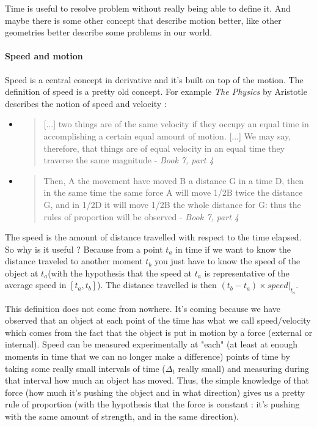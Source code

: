 \documentclass[12pt]{article}
\begin{document}
\bigskip

Time is useful to resolve problem without really being able to define it. And maybe there is some other concept that describe motion better, like other geometries better describe some problems in our world.

\paragraph{Speed and motion}

Speed is a central concept in derivative and it's built on top of the motion. The definition of speed is a pretty old concept. For example {\it The Physics} \cite{web_aristotle_the_physics} by Aristotle describes the notion of speed and velocity :
\begin{itemize}
    \item
\begin{quote}
[...] two things are of the same velocity if they occupy an equal time in accomplishing a certain equal amount of motion. [...] We may say, therefore, that things are of equal velocity in an equal time they traverse the same magnitude - {\it Book 7, part 4}
\end{quote}

    \item
\begin{quote}
 Then, A the movement have moved B a distance G in a time D, then in the same time the same force A will move 1/2B twice the distance G, and in 1/2D it will move 1/2B the whole distance for G: thus the rules of proportion will be observed - {\it Book 7, part 4}
\end{quote}
\end{itemize}


The speed is the amount of distance travelled with respect to the time elapsed. So why is it useful ? Because from a point $t_a$ in time if we want to know the distance traveled to another moment $t_b$ you just have to know the speed of the object at $t_a$(with the hypothesis that the speed at $t_a$ is representative of the average speed in $[t_a, t_b]$). The distance travelled is then $(t_b-t_a) \times speed|_{t_a}$.

This definition does not come from nowhere. It's coming because we have observed that an object at each point of the time has what we call speed/velocity which comes from the fact that the object is put in motion by a force (external or internal). 
Speed can be measured experimentally at "each" (at least at enough moments in time that we can no longer make a difference) points of time by taking some really small intervals of time ($\Delta_t$ really small) and measuring during that interval how much an object has moved.
Thus, the simple knowledge of that force (how much it's pushing the object and in what direction) gives us a pretty rule of proportion (with the hypothesis that the force is constant : it's pushing with the same amount of strength, and in the same direction). 
\end{document}
